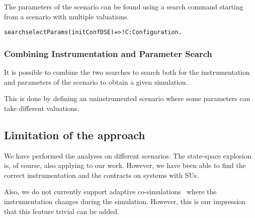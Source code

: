 The parameters of the scenario can be found using a search command starting from a scenario with multiple valuations.
\begin{alltt}
  \small
  search selectParams(initConfDSE)  =>! C:Configuration .
\end{alltt}

\subsubsection{Combining Instrumentation and Parameter Search}
It is possible to combine the two searches to search both for the instrumentation and parameters of the scenario to obtain a given simulation.

This is done by defining an uninstrumented scenario where some parameters can take different valuations.


\subsection{Limitation of the approach}
We have performed the analyses on different scenarios. 
The state-space explosion is, of course, also applying to our work. 
However, we have been able to find the correct instrumentation and the contracts on systems with  SUs.

Also, we do not currently support adaptive co-simulations~\cite{Inci2021} where the instrumentation changes during the simulation. 
However, this is our impression that this feature trivial can be added.